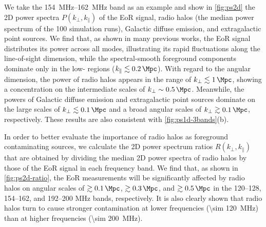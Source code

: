 \documentclass[twocolumn]{aastex62}
\newcommand{\klos}{\text{$k_{\parallel}$}}
\newcommand{\kperp}{\text{$k_{\bot}$}}
\begin{document}
We take the \SIrange{154}{162}{\MHz} band as an example and show in
\autoref{fig:ps2d} the 2D power spectra $P(\kperp, \klos)$ of the EoR
signal, radio halos (the median power spectrum of the 100 simulation runs),
Galactic diffuse emission, and extragalactic point sources.
We find that, as shown in many previous works,
the EoR signal distributes its power across all \klos{} modes,
illustrating its rapid fluctuations along the line-of-sight dimension,
while the spectral-smooth foreground components dominate only in the
low-\klos{} regions ($\klos{} \lesssim \SI{0.2}{\per\Mpc}$).
With regard to the angular dimension, the power of radio halos appears in
the range of $\kperp \lesssim \SI{1}{\per\Mpc}$, showing a concentration
on the intermediate scales of $\kperp \sim \SI{0.5}{\per\Mpc}$.
Meanwhile, the powers of Galactic diffuse emission and extragalactic
point sources dominate on the large scales of
$\kperp \lesssim \SI{0.1}{\per\Mpc}$ and a broad angular scales of
$\kperp \gtrsim \SI{0.1}{\per\Mpc}$, respectively.
These results are also consistent with \autoref{fig:ps1d-3bands}(b).

In order to better evaluate the importance of radio halos as foreground
contaminating sources, we calculate the 2D power spectrum ratios
$R(\kperp, \klos)$ that are obtained by dividing the median 2D power
spectra of radio halos by those of the EoR signal in each frequency band.
We find that, as shown in \autoref{fig:ps2d-ratio}, the EoR measurements
will be significantly affected by radio halos on angular scales of
$\gtrsim \SI{0.1}{\per\Mpc}$, $\gtrsim \SI{0.3}{\per\Mpc}$, and
$\gtrsim \SI{0.5}{\per\Mpc}$ in the \numrange{120}{128},
\numrange{154}{162}, and \numrange{192}{200} \si{\MHz} bands, respectively.
It is also clearly shown that radio halos turn to cause stronger
contamination at lower frequencies (\SI{\sim 120}{\MHz}) than at higher
frequencies (\SI{\sim 200}{\MHz}).
\end{document}
